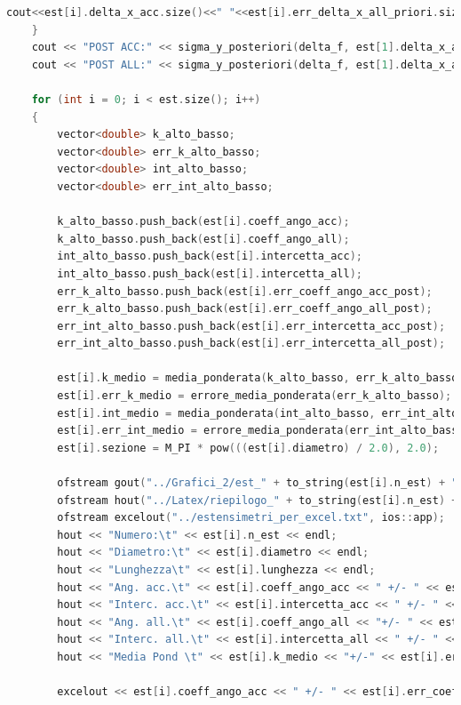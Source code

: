 \documentclass[a4paper,11pt,oneside]{article}
\begin{document}
\begin{lstlisting}[language=C++, label=lst:seconda_parte, caption=seconda\_parte]
		cout<<est[i].delta_x_acc.size()<<" "<<est[i].err_delta_x_all_priori.size()<<endl;
	}
	cout << "POST ACC:" << sigma_y_posteriori(delta_f, est[1].delta_x_acc) << endl;
	cout << "POST ALL:" << sigma_y_posteriori(delta_f, est[1].delta_x_all) << endl;

	for (int i = 0; i < est.size(); i++) 
	{
		vector<double> k_alto_basso;
		vector<double> err_k_alto_basso;
		vector<double> int_alto_basso;
		vector<double> err_int_alto_basso;

		k_alto_basso.push_back(est[i].coeff_ango_acc);
		k_alto_basso.push_back(est[i].coeff_ango_all);
		int_alto_basso.push_back(est[i].intercetta_acc);
		int_alto_basso.push_back(est[i].intercetta_all);
		err_k_alto_basso.push_back(est[i].err_coeff_ango_acc_post); 
		err_k_alto_basso.push_back(est[i].err_coeff_ango_all_post); 
		err_int_alto_basso.push_back(est[i].err_intercetta_acc_post);
		err_int_alto_basso.push_back(est[i].err_intercetta_all_post);

		est[i].k_medio = media_ponderata(k_alto_basso, err_k_alto_basso);
		est[i].err_k_medio = errore_media_ponderata(err_k_alto_basso);
		est[i].int_medio = media_ponderata(int_alto_basso, err_int_alto_basso);
		est[i].err_int_medio = errore_media_ponderata(err_int_alto_basso);
		est[i].sezione = M_PI * pow(((est[i].diametro) / 2.0), 2.0);

		ofstream gout("../Grafici_2/est_" + to_string(est[i].n_est) + ".txt");	 
		ofstream hout("../Latex/riepilogo_" + to_string(est[i].n_est) + ".txt"); 
		ofstream excelout("../estensimetri_per_excel.txt", ios::app);
		hout << "Numero:\t" << est[i].n_est << endl;
		hout << "Diametro:\t" << est[i].diametro << endl;
		hout << "Lunghezza\t" << est[i].lunghezza << endl;
		hout << "Ang. acc.\t" << est[i].coeff_ango_acc << " +/- " << est[i].err_coeff_ango_acc_post << endl;	
		hout << "Interc. acc.\t" << est[i].intercetta_acc << " +/- " << est[i].err_intercetta_acc_post << endl; 
		hout << "Ang. all.\t" << est[i].coeff_ango_all << "+/- " << est[i].err_coeff_ango_all_post << endl;		
		hout << "Interc. all.\t" << est[i].intercetta_all << " +/- " << est[i].err_intercetta_all_post << endl; 
		hout << "Media Pond \t" << est[i].k_medio << "+/-" << est[i].err_k_medio << endl;
		
		excelout << est[i].coeff_ango_acc << " +/- " << est[i].err_coeff_ango_acc_post << "\t" << est[i].coeff_ango_all << "+/- " << est[i].err_coeff_ango_all_post << "\t" << est[i].k_medio << "+/-" << est[i].err_k_medio << "\t" << comp_3(est[i].coeff_ango_acc, est[i].coeff_ango_all, est[i].err_coeff_ango_acc_post, est[i].err_coeff_ango_all_post) << "\t" << est[i].intercetta_acc << " +/- " << est[i].err_intercetta_acc_post << "\t" << est[i].intercetta_all << " +/- " << est[i].err_intercetta_all_post << "\t" << est[i].int_medio << " +/- " << est[i].err_int_medio << "\t" << comp_3(est[i].intercetta_acc, est[i].intercetta_all, est[i].err_intercetta_acc_post, est[i].err_intercetta_all_post) << endl;


\end{lstlisting}
\end{document}
